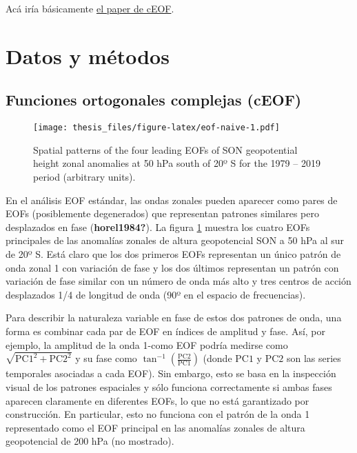 \documentclass[12pt,oneside]{reedthesis}
\begin{document}
Acá iría básicamente \href{https://github.com/eliocamp/shceof}{el paper de cEOF}.

\hypertarget{datos-y-muxe9todos}{%
\section{Datos y métodos}\label{datos-y-muxe9todos}}

\hypertarget{funciones-ortogonales-complejas-ceof}{%
\subsection{Funciones ortogonales complejas (cEOF)}\label{funciones-ortogonales-complejas-ceof}}


\begin{figure}
\centering
\texttt{[image: thesis\_files/figure-latex/eof-naive-1.pdf]}
\caption{\label{fig:eof-naive}Spatial patterns of the four leading EOFs of SON geopotential height zonal anomalies at 50 hPa south of 20º S for the 1979 -- 2019 period (arbitrary units).}
\end{figure}
En el análisis EOF estándar, las ondas zonales pueden aparecer como pares de EOFs (posiblemente degenerados) que representan patrones similares pero desplazados en fase (\textbf{horel1984?}).
La figura \ref{fig:eof-naive} muestra los cuatro EOFs principales de las anomalías zonales de altura geopotencial SON a 50 hPa al sur de 20º S.
Está claro que los dos primeros EOFs representan un único patrón de onda zonal 1 con variación de fase y los dos últimos representan un patrón con variación de fase similar con un número de onda más alto y tres centros de acción desplazados 1/4 de longitud de onda (90º en el espacio de frecuencias).

Para describir la naturaleza variable en fase de estos dos patrones de onda, una forma es combinar cada par de EOF en índices de amplitud y fase.
Así, por ejemplo, la amplitud de la onda 1-como EOF podría medirse como \(\sqrt{\mathrm{PC1}^2 + \mathrm{PC2}^2}\) y su fase como \(\tan^{-1} \left ( \frac{\mathrm{PC2}}{\mathrm{PC1}} \right )\) (donde \(\mathrm{PC1}\) y \(\mathrm{PC2}\) son las series temporales asociadas a cada EOF).
Sin embargo, esto se basa en la inspección visual de los patrones espaciales y sólo funciona correctamente si ambas fases aparecen claramente en diferentes EOFs, lo que no está garantizado por construcción.
En particular, esto no funciona con el patrón de la onda 1 representado como el EOF principal en las anomalías zonales de altura geopotencial de 200 hPa (no mostrado).
\end{document}
